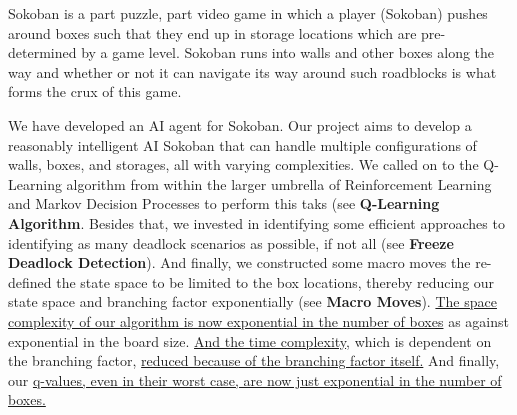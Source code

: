 \documentclass{article}
\begin{document}
Sokoban is a part puzzle, part video game in which a player (Sokoban) pushes around boxes such that they end up in storage locations which are pre-determined by a game level. Sokoban runs into walls and other boxes along the way and whether or not it can navigate its way around such roadblocks is what forms the crux of this game. 

We have developed an AI agent for Sokoban. Our project aims to develop a reasonably intelligent AI Sokoban that can handle multiple configurations of walls, boxes, and storages, all with varying complexities. We called on to the Q-Learning algorithm from within the larger umbrella of Reinforcement Learning and Markov Decision Processes to perform this taks (see \textbf{Q-Learning Algorithm}. Besides that, we invested in identifying some efficient approaches to identifying as many deadlock scenarios as possible, if not all (see \textbf{Freeze Deadlock Detection}). And finally, we constructed some macro moves the re-defined the state space to be limited to the box locations, thereby reducing our state space and branching factor exponentially (see \textbf{Macro Moves}). \underline{The space complexity of our algorithm is now exponential in the number of boxes} as against exponential in the board size. \underline{And the time complexity}, which is dependent on the branching factor, \underline{reduced because of the branching factor itself.} And finally, our \underline{q-values, even in their worst case, are now just exponential in the number of boxes.}





\end{document}
